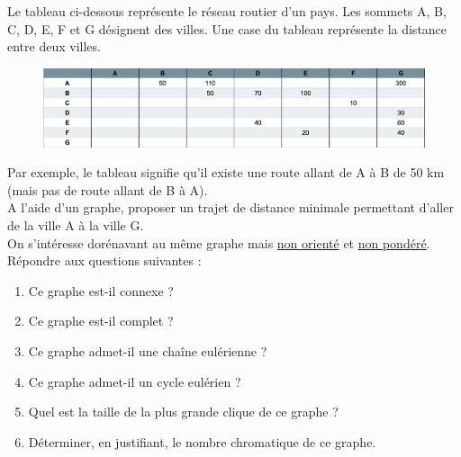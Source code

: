 \documentclass{article}[12pt]
\begin{document}
 Le tableau ci-dessous représente le réseau routier d'un pays. Les sommets A, B, C, D, E, F et G désignent des villes. Une case du tableau représente la distance entre deux villes.
 
 \begin{figure}[h!]
    \centering
    \includegraphics[scale=0.5]{table_graph.png}
    \label{fig:my_label}
\end{figure}

 
 Par exemple, le tableau signifie qu'il existe une route allant de A à B de 50 km (mais pas de route allant de B à A).\\
 
 A l'aide d'un graphe, proposer un trajet de distance minimale permettant d'aller de la ville A à la ville G.\\




 On s'intéresse dorénavant au même graphe mais \underline{non orienté} et \underline{non pondéré}.\\
 Répondre aux questions suivantes :
\begin{enumerate}
    \item Ce graphe est-il connexe ?
    \item Ce graphe est-il complet ?
    \item Ce graphe admet-il une chaîne eulérienne ?
    \item Ce graphe admet-il un cycle eulérien ?
    \item Quel est la taille de la plus grande clique de ce graphe ?
    \item Déterminer, en justifiant, le nombre chromatique de ce graphe.
\end{enumerate}
\end{document}
